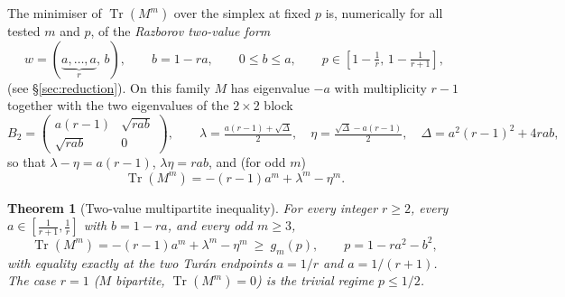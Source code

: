 \documentclass[11pt]{article}
\newtheorem{theorem}{Theorem}[section]
\theoremstyle{remark}
\newcommand{\Tr}{\operatorname{Tr}}
\begin{document}
The minimiser of $\Tr(M^m)$ over the simplex at fixed $p$ is, numerically for all tested $m$ and $p$, of the \emph{Razborov two-value form}
\[
        w=(\underbrace{a,\dots,a}_{r},\,b),\qquad b=1-ra,\qquad 0\le b\le a,\qquad p\in[1-\tfrac1r,\,1-\tfrac1{r+1}],
\]
(see \S\ref{sec:reduction}).  On this family $M$ has eigenvalue $-a$ with multiplicity $r-1$ together with the two eigenvalues of the $2\times2$ block
\begin{equation}\label{eq:block}
        B_2=\begin{pmatrix} a(r-1) & \sqrt{rab}\\[1mm] \sqrt{rab} & 0\end{pmatrix},
        \qquad \lambda=\tfrac{a(r-1)+\sqrt\Delta}{2},\quad \eta=\tfrac{\sqrt\Delta-a(r-1)}{2},\quad \Delta=a^2(r-1)^2+4rab,
\end{equation}
so that $\lambda-\eta=a(r-1)$, $\lambda\eta=rab$, and (for odd $m$)
\begin{equation}\label{eq:trace2}
        \Tr(M^m)=-(r-1)a^m+\lambda^m-\eta^m.
\end{equation}

\begin{theorem}[Two-value multipartite inequality]\label{thm:twovalue}
For every integer $r\ge2$, every $a\in[\tfrac1{r+1},\tfrac1r]$ with $b=1-ra$, and every odd $m\ge3$,
\[
        \Tr(M^m)=-(r-1)a^m+\lambda^m-\eta^m\ \ge\ g_m(p),\qquad p=1-ra^2-b^2,
\]
with equality exactly at the two Tur\'an endpoints $a=1/r$ and $a=1/(r+1)$.  The case $r=1$ ($M$ bipartite, $\Tr(M^m)=0$) is the trivial regime $p\le1/2$.
\end{theorem}
\end{document}
